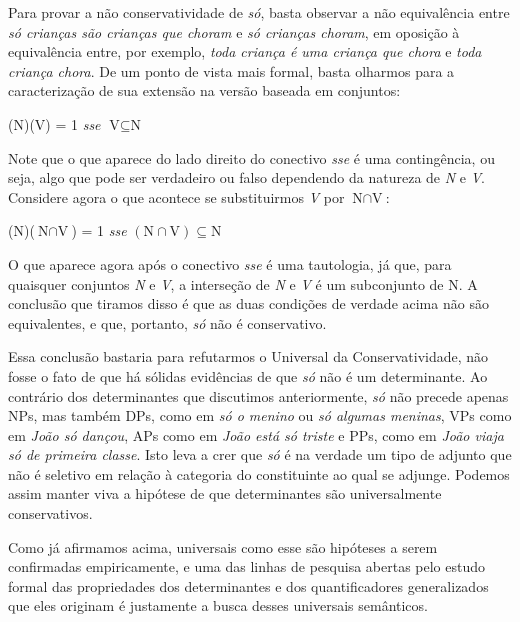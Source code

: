 Para provar a não conservatividade de \textit{só}, basta observar a não equivalência entre \textit{só crianças são crianças que choram} e \textit{só crianças choram}, em oposição à equivalência entre, por exemplo, \textit{toda criança é uma criança que chora} e \textit{toda criança chora}. De um ponto de vista mais formal, basta olharmos para
a caracterização de sua extensão na versão baseada em conjuntos:

\begin{exe}
	\ex {}(N)(V) = 1 \textit{sse} $\text{V}\subseteq\text{N}$
\end{exe}

\n Note que o que aparece do lado direito do conectivo
\textit{sse} é uma contingência, ou seja, algo que pode ser
verdadeiro ou falso dependendo da natureza de \textit{N} e
\textit{V}. Considere agora o que acontece se substituirmos
\textit{V} por
$\text{N}\cap\text{V}$:

\begin{exe}
	\ex {}(N)($\text{N}\cap\text{V}$) = 1 \textit{sse} $(\text{N}\cap\text{V})\subseteq\text{N}$
\end{exe}

\n O que aparece agora após o conectivo \textit{sse} é uma
tautologia, já que, para quaisquer conjuntos \textit{N} e
\textit{V}, a interseção de \textit{N} e \textit{V} é um
subconjunto de N. A conclusão que tiramos disso é que as duas
condições de verdade acima não são equivalentes, e que, portanto,
\textit{só} não é conservativo.

Essa conclusão bastaria para refutarmos o Universal da
Conservatividade, não fosse o fato de que há sólidas evidências de
que \textit{só} não é um determinante. Ao contrário dos
determinantes que discutimos anteriormente, \textit{só} não
precede apenas NPs, mas também DPs, como em \textit{só o menino}
ou \textit{só algumas meninas}, VPs como em \textit{João só
dançou}, APs como em \textit{João está só triste} e PPs, como em
\textit{João viaja só de primeira classe}. Isto leva a crer que \textit{só} é
na verdade um tipo de adjunto que não é seletivo em relação à
categoria do constituinte ao qual se adjunge. Podemos assim manter
viva a hipótese de que determinantes são universalmente
conservativos.

Como já afirmamos acima, universais como esse são hipóteses a serem
confirmadas empiricamente, e uma das linhas de pesquisa abertas
pelo estudo formal das propriedades dos determinantes e dos
quantificadores generalizados que eles originam é justamente a
busca desses universais semânticos.

